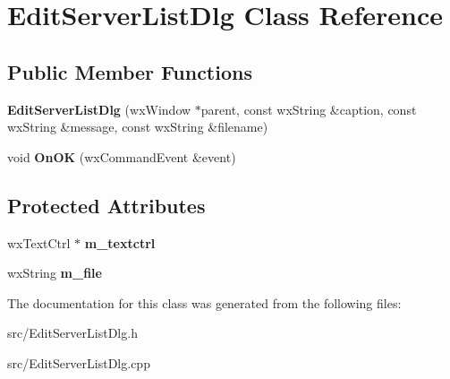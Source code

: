 \section{EditServerListDlg Class Reference}
\label{classEditServerListDlg}
\subsection*{Public Member Functions}
\begin{DoxyCompactItemize}
\item 
{\bfseries EditServerListDlg} (wxWindow $\ast$parent, const wxString \&caption, const wxString \&message, const wxString \&filename)\label{classEditServerListDlg_a6b5737510a53c8f411712967ada788bb}

\item 
void {\bfseries OnOK} (wxCommandEvent \&event)\label{classEditServerListDlg_a2538857350f665623681b914a2f05d18}

\end{DoxyCompactItemize}
\subsection*{Protected Attributes}
\begin{DoxyCompactItemize}
\item 
wxTextCtrl $\ast$ {\bfseries m\_\-textctrl}\label{classEditServerListDlg_aa99e3131d0755c9c484340975303edda}

\item 
wxString {\bfseries m\_\-file}\label{classEditServerListDlg_a8f983231fb9b32b19f77156feccc9797}

\end{DoxyCompactItemize}


The documentation for this class was generated from the following files:\begin{DoxyCompactItemize}
\item 
src/EditServerListDlg.h\item 
src/EditServerListDlg.cpp\end{DoxyCompactItemize}

